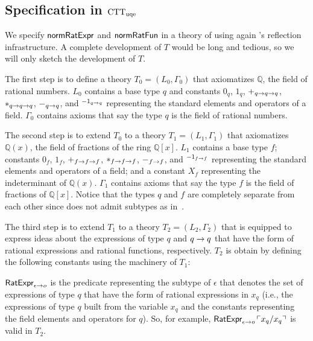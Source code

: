\documentclass[fleqn]{llncs}
\newcommand{\QQ}{\ensuremath{\mathbb{Q}}}
\newcommand{\NRE}{\ensuremath{\mname{normRatExpr}}}
\newcommand{\NRF}{\ensuremath{\mname{normRatFun}}}
\begin{document}
\subsection{Specification in ${\rm CTT}_{\rm uqe}$}

We specify {\NRE} and {\NRF} in a theory of {\churchuqe} using again
{\churchuqe}'s reflection infrastructure.  A complete development of
$T$ would be long and tedious, so we will only sketch the development
of $T$.

The first step is to define a theory $T_0 = (L_0,\Gamma_0)$ that
axiomatizes $\QQ$, the field of rational numbers.  $L_0$ contains a
base type $q$ and constants $0_q$, $1_q$, $+_{q \rightarrow q \rightarrow q}$,
$*_{q \rightarrow q \rightarrow q}$, $-_{q \rightarrow q}$, and
$\phantom{}^{{-1}_{q \rightarrow q}}$ representing the standard elements
and operators of a field.  $\Gamma_0$ contains axioms that say the
type $q$ is the field of rational numbers.

The second step is to extend $T_0$ to a theory $T_1 = (L_1,\Gamma_1)$
that axiomatizes $\QQ(x)$, the field of fractions of the ring
$\QQ[x]$.  $L_1$ contains a base type $f$; constants $0_f$, $1_f$,
$+_{f \rightarrow f \rightarrow f}$, $*_{f \rightarrow f \rightarrow f}$, $-_{f
  \rightarrow f}$, and $\phantom{}^{{-1}_{f \rightarrow f}}$ representing the
standard elements and operators of a field; and a constant $X_f$
representing the indeterminant of $\QQ(x)$.  $\Gamma_1$ contains
axioms that say the type $f$ is the field of fractions of $\QQ[x]$.
Notice that the types $q$ and $f$ are completely separate from each
other since {\churchuqe} does not admit subtypes as
in~\cite{Farmer93b}.

The third step is to extend $T_1$ to a theory $T_2 = (L_2,\Gamma_2)$
that is equipped to express ideas about the expressions of type $q$
and $q \rightarrow q$ that have the form of rational expressions and
rational functions, respectively.  $T_2$ is obtain by defining
the following constants  using the machinery of $T_1$:

\be

  \item $\mbox{\sf RatExpr}_{\epsilon \rightarrow o}$ is the predicate
    representing the subtype of $\epsilon$ that denotes the set of
    expressions of type $q$ that have the form of rational expressions
    in $x_q$ (i.e., the expressions of type $q$ built from the
    variable $x_q$ and the constants representing the field elements
    and operators for $q$).  So, for example,
    $\mbox{\sf RatExpr}_{\epsilon \rightarrow o} \, \ulcorner x_q/x_q\urcorner$ is
    valid in $T_2$.
\end{document}
